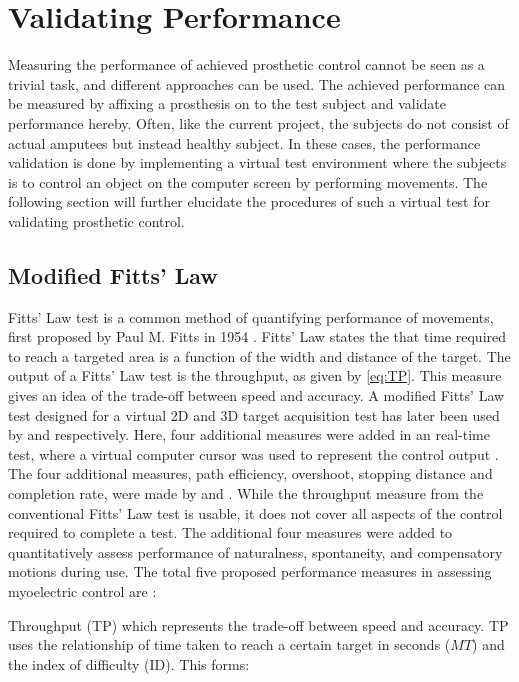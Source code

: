 
\section{Validating Performance} \label{sec:BG:validatingPerformance}

Measuring the performance of achieved prosthetic control cannot be seen as a trivial task, and different approaches can be used. The achieved performance can be measured by affixing a prosthesis on to the test subject and validate performance hereby. Often, like the current project, the subjects do not consist of actual amputees but instead healthy subject. In these cases, the performance validation is done by implementing a virtual test environment where the subjects is to control an object on the computer screen by performing movements. The following section will further elucidate the procedures of such a virtual test for validating prosthetic control.      


\subsection{Modified Fitts' Law} \label{sub:BG:fitts}

Fitts' Law test is a common method of quantifying performance of movements, first proposed by Paul M. Fitts in 1954 \cite{Fitts1954}. Fitts' Law states the that time required to reach a targeted area is a function of the width and distance of the target. The output of a Fitts' Law test is the throughput, as given by \eqref{eq:TP}. This measure gives an idea of the trade-off between speed and accuracy. A modified Fitts' Law test designed for a virtual 2D and 3D target acquisition test has later been used by \cite{Kamavuako2014} and \cite{Scheme2013} respectively. Here, four additional measures were added in an real-time test, where a virtual computer cursor was used to represent the control output \cite{Scheme2013, Kamavuako2014}. The four additional measures, path efficiency, overshoot, stopping distance and completion rate, were made by \cite{Poulton2013} and \cite{Simon2011}. While the throughput measure from the conventional Fitts' Law test is usable, it does not cover all aspects of the control required to complete a test. The additional four measures were added to quantitatively assess performance of naturalness, spontaneity, and compensatory motions during use. The total five proposed performance measures in assessing myoelectric control are \cite{Scheme2013a}: 

Throughput (TP) which represents the trade-off between speed and accuracy. TP uses the relationship of time taken to reach a certain target in seconds ($MT$) and the index of difficulty (ID). This forms: \cite{Scheme2013,Fitts1954}

